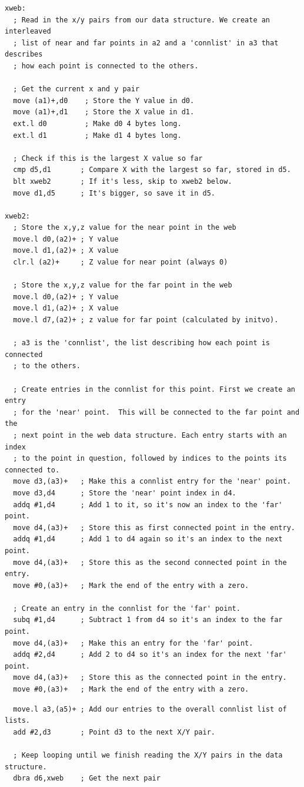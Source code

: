 \begin{lstlisting}
xweb:
  ; Read in the x/y pairs from our data structure. We create an interleaved
  ; list of near and far points in a2 and a 'connlist' in a3 that describes
  ; how each point is connected to the others.

  ; Get the current x and y pair
  move (a1)+,d0    ; Store the Y value in d0.
  move (a1)+,d1    ; Store the X value in d1.
  ext.l d0         ; Make d0 4 bytes long.
  ext.l d1         ; Make d1 4 bytes long.

  ; Check if this is the largest X value so far
  cmp d5,d1       ; Compare X with the largest so far, stored in d5. 
  blt xweb2       ; If it's less, skip to xweb2 below.
  move d1,d5      ; It's bigger, so save it in d5.

xweb2:
  ; Store the x,y,z value for the near point in the web
  move.l d0,(a2)+ ; Y value
  move.l d1,(a2)+ ; X value
  clr.l (a2)+     ; Z value for near point (always 0)

  ; Store the x,y,z value for the far point in the web
  move.l d0,(a2)+ ; Y value
  move.l d1,(a2)+ ; X value
  move.l d7,(a2)+ ; z value for far point (calculated by initvo).

  ; a3 is the 'connlist', the list describing how each point is connected
  ; to the others. 

  ; Create entries in the connlist for this point. First we create an entry
  ; for the 'near' point.  This will be connected to the far point and the
  ; next point in the web data structure. Each entry starts with an index
  ; to the point in question, followed by indices to the points its connected to.
  move d3,(a3)+   ; Make this a connlist entry for the 'near' point. 
  move d3,d4      ; Store the 'near' point index in d4. 
  addq #1,d4      ; Add 1 to it, so it's now an index to the 'far' point.
  move d4,(a3)+   ; Store this as first connected point in the entry.
  addq #1,d4      ; Add 1 to d4 again so it's an index to the next point.
  move d4,(a3)+   ; Store this as the second connected point in the entry.
  move #0,(a3)+   ; Mark the end of the entry with a zero.

  ; Create an entry in the connlist for the 'far' point.
  subq #1,d4      ; Subtract 1 from d4 so it's an index to the far point.
  move d4,(a3)+   ; Make this an entry for the 'far' point.
  addq #2,d4      ; Add 2 to d4 so it's an index for the next 'far' point.
  move d4,(a3)+   ; Store this as the connected point in the entry.
  move #0,(a3)+   ; Mark the end of the entry with a zero.
\end{lstlisting}
\begin{lstlisting}
  move.l a3,(a5)+ ; Add our entries to the overall connlist list of lists.
  add #2,d3       ; Point d3 to the next X/Y pair.

  ; Keep looping until we finish reading the X/Y pairs in the data structure.
  dbra d6,xweb    ; Get the next pair
\end{lstlisting}

